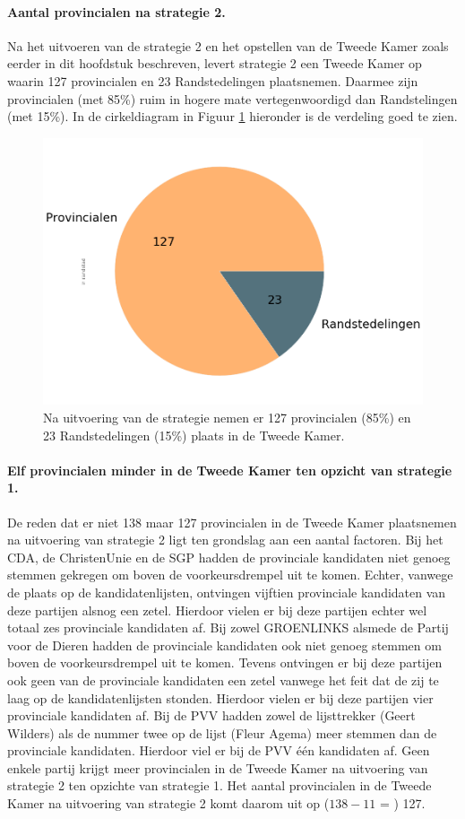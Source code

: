 \paragraph{Aantal provincialen na strategie 2.}
Na het uitvoeren van de strategie 2 en het opstellen van de Tweede Kamer zoals eerder in dit hoofdstuk beschreven, levert strategie 2 een Tweede Kamer op waarin 127 provincialen en 23 Randstedelingen plaatsnemen. Daarmee zijn provincialen (met  85\%) ruim in hogere mate vertegenwoordigd dan Randstelingen (met 15\%). In de cirkeldiagram in Figuur \ref{fig:pcS2P} hieronder is de verdeling goed te zien. 


\begin{figure}[H]
\centering
	\includegraphics[width=0.45\linewidth]{pie_chart_willekeurig_provincialen.png}

			\caption{Na uitvoering van de strategie nemen er 127 provincialen (85\%) en 23 Randstedelingen (15\%) plaats in de Tweede Kamer.}

\label{fig:pcS2P}
\end{figure}





\paragraph{Elf provincialen minder in de Tweede Kamer ten opzicht van strategie 1.}
De reden dat er niet 138 maar 127 provincialen in de Tweede Kamer plaatsnemen na uitvoering van strategie 2 ligt ten grondslag aan een aantal factoren. Bij het CDA, de ChristenUnie en de SGP hadden de provinciale kandidaten niet genoeg stemmen gekregen om boven de voorkeursdrempel uit te komen. Echter, vanwege de plaats op de kandidatenlijsten, ontvingen vijftien provinciale kandidaten van deze partijen alsnog een zetel. Hierdoor vielen er bij deze partijen echter wel totaal zes provinciale kandidaten af. Bij zowel GROENLINKS alsmede de Partij voor de Dieren hadden de provinciale kandidaten ook niet genoeg stemmen om boven de voorkeursdrempel uit te komen. Tevens ontvingen er bij deze partijen ook geen van de provinciale kandidaten een zetel vanwege het feit dat de zij te laag op de kandidatenlijsten stonden. Hierdoor vielen er bij deze partijen vier provinciale kandidaten af. Bij de PVV hadden zowel de lijsttrekker (Geert Wilders) als de nummer twee op de lijst (Fleur Agema) meer stemmen dan de provinciale kandidaten. Hierdoor viel er bij de PVV één kandidaten af. Geen enkele partij krijgt meer provincialen in de Tweede Kamer na uitvoering van strategie 2 ten opzichte van strategie 1. Het aantal provincialen in de Tweede Kamer na uitvoering van strategie 2 komt daarom uit op ($138-11$ = ) 127.



